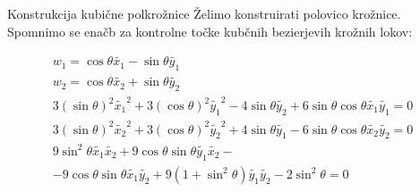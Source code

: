 \documentclass[t]{beamer}
\begin{document}
\begin{frame}{Konstrukcija kubične polkrožnice}
Želimo konstruirati polovico krožnice. Spomnimo se enačb za kontrolne točke kubčnih bezierjevih krožnih lokov:

\begin{align*}
w_{1} = \cos \theta \tilde{x_{1}} - \sin \theta  \tilde{y_{1}} \\
w_{2} = \cos \theta  \tilde{x_{2}} + \sin \theta  \tilde{y_{2}} \\
3(\sin \theta )^{2} \tilde{x_{1}}^2 + 3(\cos \theta )^{2} \tilde{y_{1}}^2 - 4 \sin \theta \tilde{y_{2}} + 6\sin \theta \cos \theta \tilde{x_{1}}\tilde{y_{1}} = 0 \\
3(\sin \theta )^{2} \tilde{x_{2}}^2 + 3(\cos \theta )^{2} \tilde{y_{2}}^2 + 4 \sin \theta \tilde{y_{1}} - 6\sin \theta \cos \theta \tilde{x_{2}}\tilde{y_{2}} = 0 \\
9\sin^{2}\theta \tilde{x_{1}}\tilde{x_{2}} + 9 \cos \theta \sin \theta \tilde{y_{1}}\tilde{x_{2}} -\\ -9\cos \theta \sin \theta \tilde{x_{1}} \tilde{y_{2}} + 9 (1 + \sin^2 \theta) \tilde{y_{1}} \tilde{y_{2}} - 2\sin^2\theta = 0
\end{align*}
\end{frame}
\end{document}
